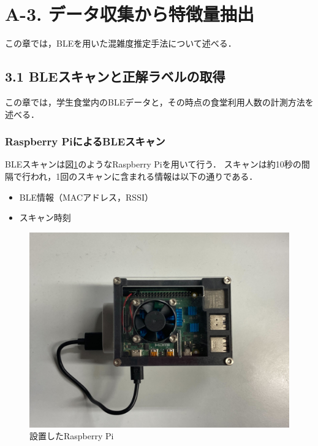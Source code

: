 \section*{A-3. データ収集から特徴量抽出}
この章では，BLEを用いた混雑度推定手法について述べる．

\subsection*{3.1 BLEスキャンと正解ラベルの取得}
この章では，学生食堂内のBLEデータと，その時点の食堂利用人数の計測方法を述べる．

\subsubsection*{Raspberry PiによるBLEスキャン}
BLEスキャンは図\ref{raspi}のようなRaspberry Piを用いて行う．
スキャンは約10秒の間隔で行われ，1回のスキャンに含まれる情報は以下の通りである．
\begin{itemize}
  \item BLE情報（MACアドレス，RSSI）
  \item スキャン時刻
\end{itemize}

\begin{figure}[pt]
  \includegraphics[scale=0.07]{./images/raspi.jpg}
  \centering
  \caption{設置したRaspberry Pi\label{raspi}}
\end{figure}

